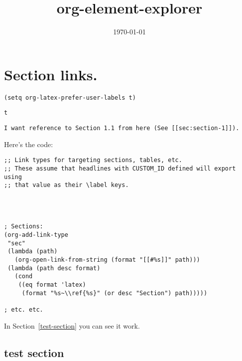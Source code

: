 \documentclass[11pt]{article}
\date{\today}
\title{org-element-explorer}
\begin{document}
\section{Section links.}
\label{sec-1}

\begin{verbatim}
(setq org-latex-prefer-user-labels t)
\end{verbatim}

\begin{verbatim}
t
\end{verbatim}

\begin{verbatim}
I want reference to Section 1.1 from here (See [[sec:section-1]]).
\end{verbatim}

Here's the code:
\begin{verbatim}
;; Link types for targeting sections, tables, etc.
;; These assume that headlines with CUSTOM_ID defined will export using
;; that value as their \label keys.




; Sections:
(org-add-link-type
 "sec"
 (lambda (path)
   (org-open-link-from-string (format "[[#%s]]" path)))
 (lambda (path desc format)
   (cond
    ((eq format 'latex)
     (format "%s~\\ref{%s}" (or desc "Section") path)))))

; etc. etc.
\end{verbatim}

In Section~\ref{test-section} you can see it work.

\subsection{test section}
\label{sec-1-1}
\end{document}
